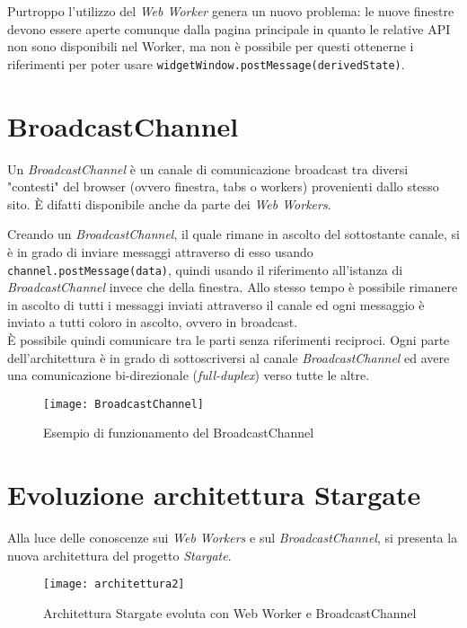 Purtroppo l'utilizzo del \textit{Web Worker} genera un nuovo problema: le nuove finestre devono essere aperte comunque dalla pagina principale in quanto le relative API non sono disponibili nel Worker, ma non è possibile per questi ottenerne i riferimenti per poter usare \texttt{widgetWindow.postMessage(derivedState)}. 

\section{BroadcastChannel}

Un \textit{BroadcastChannel} è un canale di comunicazione broadcast tra diversi "contesti" del browser (ovvero finestra, tabs o workers) provenienti dallo stesso sito. È difatti disponibile anche da parte dei \textit{Web Workers}.

Creando un \textit{BroadcastChannel}, il quale rimane in ascolto del sottostante canale, si è in grado di inviare messaggi attraverso di esso usando \texttt{channel.postMessage(data)}, quindi usando il riferimento all'istanza di \textit{BroadcastChannel} invece che della finestra. Allo stesso tempo è possibile rimanere in ascolto di tutti i messaggi inviati attraverso il canale ed ogni messaggio è inviato a tutti coloro in ascolto, ovvero in broadcast. \\

È possibile quindi comunicare tra le parti senza riferimenti reciproci. Ogni parte dell'architettura è in grado di sottoscriversi al canale \textit{BroadcastChannel} ed avere una comunicazione bi-direzionale (\textit{full-duplex}) verso tutte le altre.

\begin{figure}[H] 
  \centering 
  \texttt{[image: BroadcastChannel]} 
  \caption{Esempio di funzionamento del BroadcastChannel}
\end{figure}

\section{Evoluzione architettura Stargate}

Alla luce delle conoscenze sui \textit{Web Workers} e sul \textit{BroadcastChannel}, si presenta la nuova architettura del progetto \textit{Stargate}.

\begin{figure}[H] 
  \centering 
  \texttt{[image: architettura2]} 
  \caption{Architettura Stargate evoluta con Web Worker e BroadcastChannel}
\end{figure}

